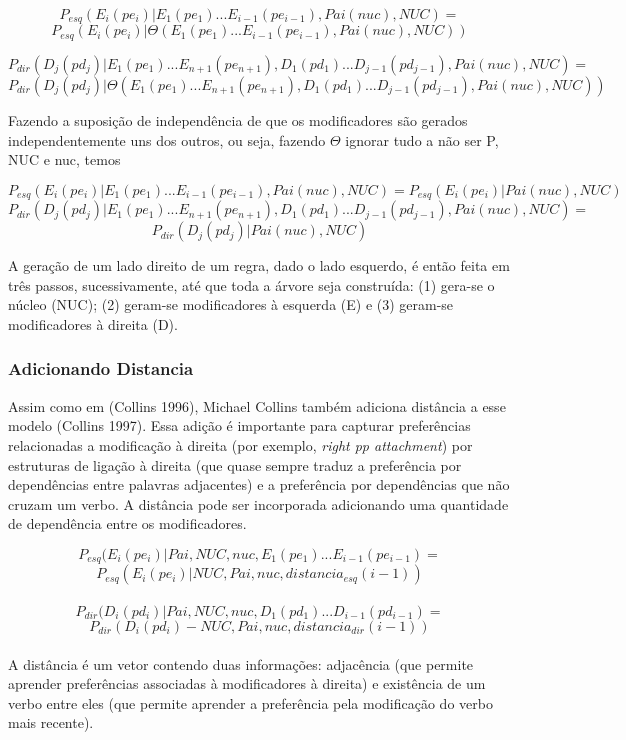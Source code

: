 $$P_{esq}(E_i(pe_i)|E_1(pe_1)...E_{i-1}(pe_{i-1}), Pai(nuc),NUC) = $$
$$P_{esq}(E_i(pe_i)|\Theta(E_1(pe_1)...E_{i-1}(pe_{i-1}), Pai(nuc),NUC))$$

$$P_{dir}(D_j(pd_j)|E_1(pe_1)...E_{n+1}(pe_{n+1}),D_1(pd_1)...D_{j-1}(pd_{j-1}), Pai(nuc),NUC) = $$
$$P_{dir}(D_j(pd_j)|\Theta(E_1(pe_1)...E_{n+1}(pe_{n+1}),D_1(pd_1)...D_{j-1}(pd_{j-1}), Pai(nuc),NUC))$$



Fazendo a suposição de independência de que os modificadores são gerados independentemente uns dos outros, ou seja, fazendo $\Theta$ ignorar tudo a não ser P, NUC e nuc, temos


$$P_{esq}(E_i(pe_i)|E_1(pe_1)...E_{i-1}(pe_{i-1}), Pai(nuc),NUC) = P_{esq}(E_i(pe_i)|Pai(nuc),NUC)$$
$$P_{dir}(D_j(pd_j)|E_1(pe_1)...E_{n+1}(pe_{n+1}),D_1(pd_1)...D_{j-1}(pd_{j-1}), Pai(nuc),NUC) =$$
$$P_{dir}(D_j(pd_j)|Pai(nuc),NUC)$$


A geração de um lado direito de um regra, dado o lado esquerdo, é então feita em
três passos, sucessivamente, até que toda a árvore seja construída: (1) gera-se o núcleo (NUC); (2) geram-se modificadores à esquerda (E) e (3) geram-se modificadores à direita (D).


\subsubsection{Adicionando Distancia}
\label{sub:distancia}

Assim como em (Collins 1996), Michael Collins também adiciona distância a esse modelo (Collins 1997). Essa adição é importante para capturar preferências relacionadas a modificação à direita (por exemplo, \emph{right pp attachment}) por estruturas de ligação à direita (que quase sempre traduz a preferência por dependências entre palavras adjacentes) e a preferência por dependências que não cruzam um verbo. A distância pode ser incorporada adicionando uma quantidade de dependência entre os modificadores.

$$P_{esq}(E_i(pe_i)|Pai,NUC, nuc,E_1(pe_1)...E_{i-1}(pe_{i - 1}) = $$
$$P_{esq}(E_i(pe_i)|NUC, Pai, nuc, distancia_{esq}(i - 1))$$
\\
$$P_{dir}(D_i(pd_i)|Pai,NUC, nuc,D_1(pd_1)...D_{i-1}(pd_{i - 1}) = $$
$$P_{dir}(D_i(pd_i)-NUC, Pai, nuc, distancia_{dir}(i - 1))$$
\\

A distância é um vetor contendo duas informações: adjacência (que permite aprender preferências associadas à modificadores à direita) e existência de um verbo entre eles (que permite aprender a preferência pela modificação do verbo mais recente).

